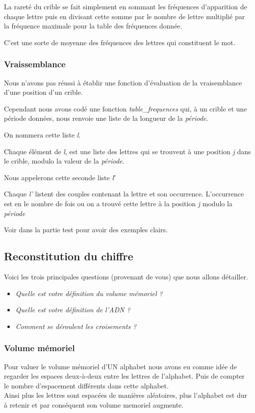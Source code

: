 \documentclass[a4paper, 11pt]{article}
\begin{document}
La rareté du crible se fait simplement en sommant les fréquences
d'apparition de chaque lettre puis en divisant cette somme par le
nombre de lettre multiplié par la fréquence maximale pour la table des
fréquences donnée.

C'est une sorte de moyenne des fréquences des lettres qui constituent
le mot.

\subsubsection{Vraissemblance}
Nous n'avons pas réussi à établir une fonction d'évaluation de la
vraisemblance d'une position d'un crible.

Cependant nous avons codé une fonction \textit{table\_frequences} qui, à un
crible et une période données, nous renvoie une liste de la longueur
de la \textit{période}.

On nommera cette liste \textit{l}.

Chaque élément de \textit{l}, est une liste des
lettres qui se trouvent à une position \textit{j} dans le crible, modulo
la valeur de la \textit{période}.

Nous appelerons cette seconde liste \textit{l$'$}

Chaque \textit{l'} listent des couples contenant la lettre et son
occurrence. L'occurrence est en le nombre de fois ou on a trouvé cette
lettre à la position \textit{j} modulo la \textit{période}

Voir dans la partie test pour avoir des exemples clairs.



\subsection{Reconstitution du chiffre}

Voici les trois principales questions (provenant de vous) que nous
allons détailler.\\

\begin{itemize}
\item \emph{Quelle est votre définition du volume mémoriel ?}
\item \emph{Quelle est votre définition de l'ADN ?}
\item \emph{Comment se déroulent les croisements ?}
\end{itemize}


\subsubsection{Volume mémoriel}
Pour valuer le volume mémoriel d'UN alphabet nous avons eu comme idée
de regarder les espaces deux-à-deux entre les lettres de
l'alphabet. Puis de compter le nombre d'espacement différents dans
cette alphabet.\\
Ainsi plus les lettres sont espacées de manières aléatoires, plus
l'alphabet est dur à retenir et par conséquent son volume memoriel
augmente.\\
\end{document}
